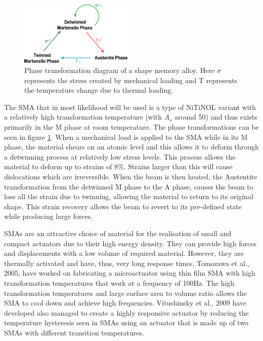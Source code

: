 \begin{figure}
  \centering
  \includegraphics[width=0.48\textwidth]{Figures/Phase_Transf_Diagram_noText.eps}
  \caption{Phase transformation diagram of a shape memory alloy. Here $\sigma$ represents the stress created by mechanical loading and T represents the temperature change due to thermal loading.}
	\vspace{-10pt}
  \label{fig:PhaseTransfDiagram}
\end{figure}


The SMA that in most likelihood will be used is a type of NiTiNOL variant with a relatively high transformation temperature (with $A_s$ around 50\degreeC) and thus exists primarily in the M phase at room temperature. The phase transformations can be seen in figure \ref{fig:PhaseTransfDiagram}. When a mechanical load is applied to the SMA while in its M phase, the material shears on an atomic level and this allows it to deform through a detwinning process at relatively low stress levels. This process allows the material to deform up to strains of 8$\%$. Strains larger than this will cause dislocations which are irreversible. When the beam is then heated, the Austentite transformation from the detwinned M phase to the A phase, causes the beam to lose all the strain due to twinning, allowing the material to return to its original shape. This strain recovery allows the beam to revert to its pre-defined state while producing large forces.

SMAs are an attractive choice of material for the realisation of small and compact actuators due to their high energy density. They can provide high forces and displacements with a low volume of required material. However, they are thermally activated and have, thus, very long response times. Tomozawa et al.\cite{tomozawa_characterization_2005}, 2005, have worked on fabricating a microactuator using thin film SMA with high transformation temperatures that work at a frequency of 100Hz. The high transformation temperatures and large surface area to volume ratio allows the SMA to cool down and achieve high frequencies. Vitushinsky et al.\cite{vitushinsky_bistable_2009}, 2009 have developed also managed to create a highly responsive actuator by reducing the temperature hysteresis seen in SMAs using an actuator that is made up of two SMAs with different transition temperatures.

